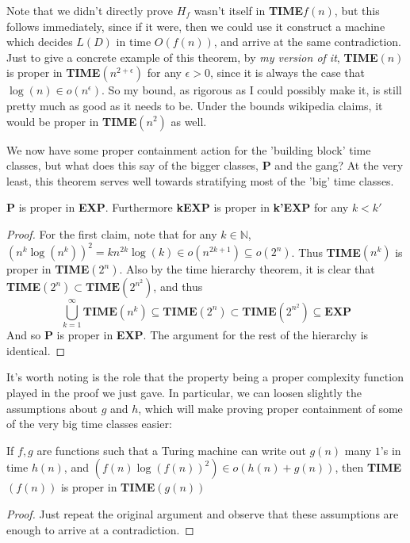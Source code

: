 Note that we didn't directly prove $H_f$ wasn't itself in \textbf{TIME}$f(n)$, but this follows immediately, since if it were, then we could use it construct a machine which decides $L(D)$ in time $O(f(n))$, and arrive at the same contradiction. Just to give a concrete example of this theorem, by \textit{my version of it}, \textbf{TIME}$(n)$ is proper in \textbf{TIME}$(n^{2+\epsilon})$ for any $\epsilon > 0$, since it is always the case that $\log(n) \in o(n^{\epsilon})$. So my bound, as rigorous as I could possibly make it, is still pretty much as good as it needs to be. Under the bounds wikipedia claims, it would be proper in \textbf{TIME}$(n^2)$ as well.
\par We now have some proper containment action for the 'building block' time classes, but what does this say of the bigger classes, \textbf{P} and the gang? At the very least, this theorem serves well towards stratifying most of the 'big' time classes.
\begin{corollary}
	\textbf{P} is proper in \textbf{EXP}. Furthermore \textbf{kEXP} is proper in \textbf{k'EXP} for any $k < k'$
\end{corollary} 
\begin{proof}
	For the first claim, note that for any $k \in \mathbb{N}$, $(n^k\log(n^k))^2 = kn^{2k}\log(k) \in o(n^{2k+1}) \subseteq o(2^n)$. Thus \textbf{TIME}$(n^k)$ is proper in \textbf{TIME}$(2^n)$. Also by the time hierarchy theorem, it is clear that \textbf{TIME}$(2^n) \subset \textbf{TIME}(2^{n^2})$, and thus 
	\[ \bigcup_{k=1}^{\infty} \textbf{TIME}(n^k) \subseteq \textbf{TIME}(2^n) \subset \textbf{TIME}(2^{n^2}) \subseteq \textbf{EXP} \]
	And so \textbf{P} is proper in \textbf{EXP}. The argument for the rest of the hierarchy is identical.
\end{proof}
\par It's worth noting is the role that the property being a proper complexity function played in the proof we just gave. In particular, we can loosen slightly the assumptions about $g$ and $h$, which will make proving proper containment of some of the very big time classes easier:
\begin{fact}
	If $f,g$ are functions such that a Turing machine can write out $g(n)$ many $1$'s in time $h(n)$, and $(f(n)\log(f(n))^2) \in o(h(n)+g(n))$, then \textbf{TIME}$(f(n))$ is proper in \textbf{TIME}$(g(n))$
\end{fact}
\begin{proof}
	Just repeat the original argument and observe that these assumptions are enough to arrive at a contradiction.
\end{proof}
